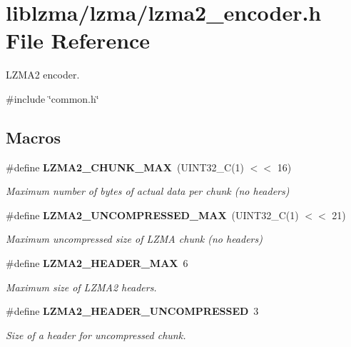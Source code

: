 \section{liblzma/lzma/lzma2\+\_\+encoder.h File Reference}
\label{lzma2__encoder_8h}


L\+Z\+M\+A2 encoder.  


{\ttfamily \#include \char`\"{}common.\+h\char`\"{}}\newline
\subsection*{Macros}
\begin{DoxyCompactItemize}
\item 
\#define \textbf{ L\+Z\+M\+A2\+\_\+\+C\+H\+U\+N\+K\+\_\+\+M\+AX}~(U\+I\+N\+T32\+\_\+C(1) $<$$<$ 16)
\begin{DoxyCompactList}\small\item\em Maximum number of bytes of actual data per chunk (no headers) \end{DoxyCompactList}\item 
\#define \textbf{ L\+Z\+M\+A2\+\_\+\+U\+N\+C\+O\+M\+P\+R\+E\+S\+S\+E\+D\+\_\+\+M\+AX}~(U\+I\+N\+T32\+\_\+C(1) $<$$<$ 21)
\begin{DoxyCompactList}\small\item\em Maximum uncompressed size of L\+Z\+MA chunk (no headers) \end{DoxyCompactList}\item 
\#define \textbf{ L\+Z\+M\+A2\+\_\+\+H\+E\+A\+D\+E\+R\+\_\+\+M\+AX}~6
\begin{DoxyCompactList}\small\item\em Maximum size of L\+Z\+M\+A2 headers. \end{DoxyCompactList}\item 
\#define \textbf{ L\+Z\+M\+A2\+\_\+\+H\+E\+A\+D\+E\+R\+\_\+\+U\+N\+C\+O\+M\+P\+R\+E\+S\+S\+ED}~3
\begin{DoxyCompactList}\small\item\em Size of a header for uncompressed chunk. \end{DoxyCompactList}\end{DoxyCompactItemize}
